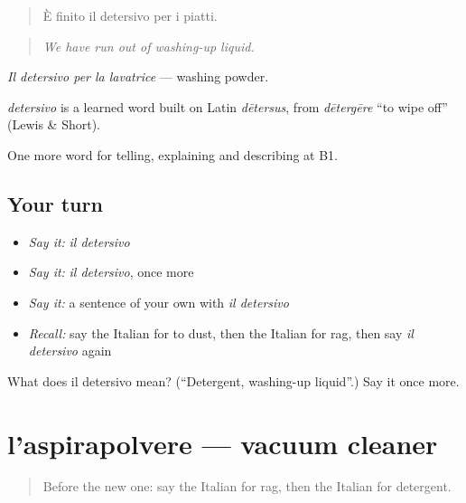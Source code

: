 \begin{quote}
È finito il detersivo per i piatti.
\end{quote}

\begin{quote}
\emph{We have run out of washing-up liquid.}
\end{quote}

\emph{Il detersivo per la lavatrice} — washing powder.

\begin{cousinweb}
\emph{detersivo} is a learned word built on Latin \emph{dētersus}, from \emph{dētergēre} \textquotedblleft{}to wipe off\textquotedblright{} (Lewis \& Short).
\end{cousinweb}

\begin{grammarlens}[title={What you've built}]
One more word for telling, explaining and describing at B1.
\end{grammarlens}

\subsection*{Your turn}
\begin{itemize}
\raggedright
  \item \emph{Say it:} \emph{il detersivo}
  \item \emph{Say it:} \emph{il detersivo}, once more
  \item \emph{Say it:} a sentence of your own with \emph{il detersivo}
  \item \emph{Recall:} say the Italian for to dust, then the Italian for rag, then say \emph{il detersivo} again
\end{itemize}

\begin{tcolorbox}[breakable,colback=teal!4,colframe=teal!35!black,title={Before you move on}]
What does il detersivo mean? (\textquotedblleft{}Detergent, washing-up liquid\textquotedblright{}.) Say it once more.
\end{tcolorbox}
\section[l'aspirapolvere]{l'aspirapolvere — vacuum cleaner}

\label{lesson:IT-C532-aspirapolvere}



\begin{quote}
Before the new one: say the Italian for rag, then the Italian for detergent.
\end{quote}


